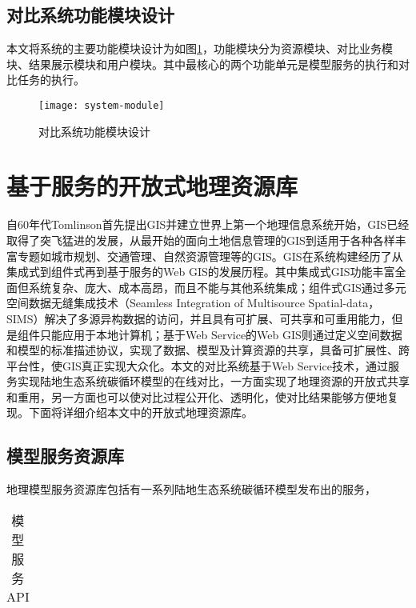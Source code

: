 \subsection{对比系统功能模块设计}
本文将系统的主要功能模块设计为如图\ref{fig:system-module}，功能模块分为资源模块、对比业务模块、结果展示模块和用户模块。其中最核心的两个功能单元是模型服务的执行和对比任务的执行。

\begin{figure}[!htbp]
    \centering
    \texttt{[image: system-module]}
    \caption{对比系统功能模块设计}
    \label{fig:system-module}
\end{figure}

\section{基于服务的开放式地理资源库}
自60年代Tomlinson首先提出GIS并建立世界上第一个地理信息系统开始，GIS已经取得了突飞猛进的发展，从最开始的面向土地信息管理的GIS到适用于各种各样丰富专题如城市规划、交通管理、自然资源管理等的GIS。GIS在系统构建经历了从集成式到组件式再到基于服务的Web GIS的发展历程。其中集成式GIS功能丰富全面但系统复杂、庞大、成本高昂，而且不能与其他系统集成；组件式GIS通过多元空间数据无缝集成技术（Seamless Integration of Multisource Spatial-data，SIMS）解决了多源异构数据的访问，并且具有可扩展、可共享和可重用能力，但是组件只能应用于本地计算机；基于Web Service的Web GIS则通过定义空间数据和模型的标准描述协议，实现了数据、模型及计算资源的共享，具备可扩展性、跨平台性，使GIS真正实现大众化。本文的对比系统基于Web Service技术，通过服务实现陆地生态系统碳循环模型的在线对比，一方面实现了地理资源的开放式共享和重用，另一方面也可以使对比过程公开化、透明化，使对比结果能够方便地复现。下面将详细介绍本文中的开放式地理资源库。

\subsection{模型服务资源库}
地理模型服务资源库包括有一系列陆地生态系统碳循环模型发布出的服务，

\begin{table}
    \centering
    \caption{模型服务API}
    \label{tab:model-service-API}
    \begin{threeparttable}
        \begin{tabu} to 1
            \toprule[1.5pt]
            \midrule[1.5pt]
            \bottomrule[1.5pt]
        \end{tabu}
    \end{threeparttable}
\end{table}

